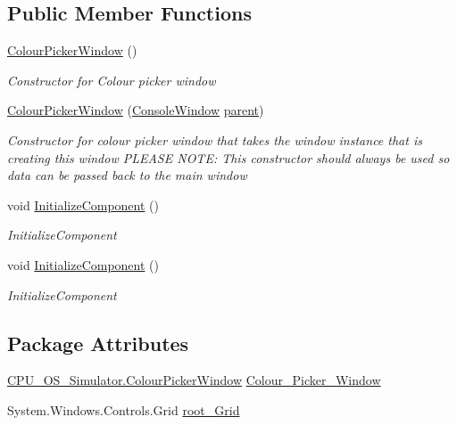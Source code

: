 \subsection*{Public Member Functions}
\begin{DoxyCompactItemize}
\item 
\hyperlink{class_c_p_u___o_s___simulator_1_1_colour_picker_window_afd196933703b7ee4bcac6cbfde73e65f}{Colour\+Picker\+Window} ()
\begin{DoxyCompactList}\small\item\em Constructor for Colour picker window \end{DoxyCompactList}\item 
\hyperlink{class_c_p_u___o_s___simulator_1_1_colour_picker_window_a6d0c7265a93ca643ad296a8664489508}{Colour\+Picker\+Window} (\hyperlink{class_c_p_u___o_s___simulator_1_1_console_window}{Console\+Window} \hyperlink{class_c_p_u___o_s___simulator_1_1_colour_picker_window_a0a40b478316b3e45a63c67347ff9fc63}{parent})
\begin{DoxyCompactList}\small\item\em Constructor for colour picker window that takes the window instance that is creating this window P\+L\+E\+A\+S\+E N\+O\+T\+E\+: This constructor should always be used so data can be passed back to the main window \end{DoxyCompactList}\item 
void \hyperlink{class_c_p_u___o_s___simulator_1_1_colour_picker_window_a83c3f68e51fd577446e25cfb2a8d05ed}{Initialize\+Component} ()
\begin{DoxyCompactList}\small\item\em Initialize\+Component \end{DoxyCompactList}\item 
void \hyperlink{class_c_p_u___o_s___simulator_1_1_colour_picker_window_a83c3f68e51fd577446e25cfb2a8d05ed}{Initialize\+Component} ()
\begin{DoxyCompactList}\small\item\em Initialize\+Component \end{DoxyCompactList}\end{DoxyCompactItemize}
\subsection*{Package Attributes}
\begin{DoxyCompactItemize}
\item 
\hyperlink{class_c_p_u___o_s___simulator_1_1_colour_picker_window}{C\+P\+U\+\_\+\+O\+S\+\_\+\+Simulator.\+Colour\+Picker\+Window} \hyperlink{class_c_p_u___o_s___simulator_1_1_colour_picker_window_ae1fb4e0b93aecac6fdff7fe54382e033}{Colour\+\_\+\+Picker\+\_\+\+Window}
\item 
System.\+Windows.\+Controls.\+Grid \hyperlink{class_c_p_u___o_s___simulator_1_1_colour_picker_window_ad3f58999085d75f00e86e4796aa87ed3}{root\+\_\+\+Grid}
\end{DoxyCompactItemize}
